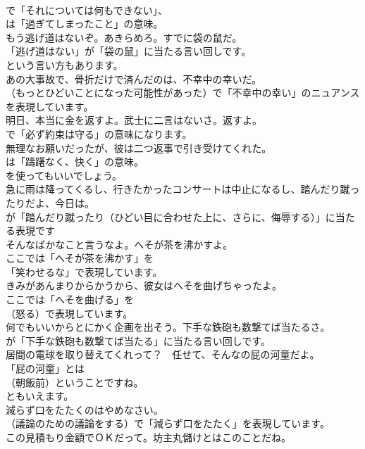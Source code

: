 \documentclass[8pt]{extreport}
\begin{document}
\begin{CJK}{UTF8}{min}
\\	で「それについては何もできない」、
\\	は「過ぎてしまったこと」の意味。	
\\	もう逃げ道はないぞ。あきらめろ。すでに袋の鼠だ。 
\\	「逃げ道はない」が「袋の鼠」に当たる言い回しです。
\\	という言い方もあります。	
\\	あの大事故で、骨折だけで済んだのは、不幸中の幸いだ。 
\\	（もっとひどいことになった可能性があった）で「不幸中の幸い」のニュアンスを表現しています。	
\\	明日、本当に金を返すよ。武士に二言はないさ。返すよ。 
\\	で「必ず約束は守る」の意味になります。	
\\	無理なお願いだったが、彼は二つ返事で引き受けてくれた。 
\\	は「躊躇なく、快く」の意味。
\\	を使ってもいいでしょう。	
\\	急に雨は降ってくるし、行きたかったコンサートは中止になるし、踏んだり蹴ったりだよ、今日は。 
\\	が「踏んだり蹴ったり（ひどい目に合わせた上に、さらに、侮辱する）」に当たる表現です	
\\	そんなばかなこと言うなよ。へそが茶を沸かすよ。 
\\	ここでは「へそが茶を沸かす」を
\\	「笑わせるな」で表現しています。	
\\	きみがあんまりからかうから、彼女はへそを曲げちゃったよ。 
\\	ここでは「へそを曲げる」を 
\\	（怒る）で表現しています。	
\\	何でもいいからとにかく企画を出そう。下手な鉄砲も数撃てば当たるさ。 
\\	が「下手な鉄砲も数撃てば当たる」に当たる言い回しです。	
\\	居間の電球を取り替えてくれって？　任せて、そんなの屁の河童だよ。 
\\	「屁の河童」とは 
\\	（朝飯前）ということですね。
\\	ともいえます。	
\\	減らず口をたたくのはやめなさい。 
\\	（議論のための議論をする）で「減らず口をたたく」を表現しています。	
\\	この見積もり金額でＯＫだって。坊主丸儲けとはこのことだね。 

\end{CJK}
\end{document}
